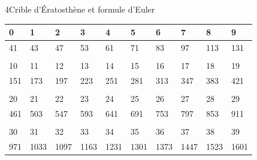 \begin{exercice}{4}{Crible d'Ératosthène et formule d'Euler}
\vspace{20pt}
\def\arraystretch{1.5}
\begin{tabularx}{\linewidth}{|*{10}{>{\centering\arraybackslash}X|}}
\hline
\cellcolor{vlmgray} 0 &\cellcolor{vlmgray} 1 &\cellcolor{vlmgray} 2 &\cellcolor{vlmgray} 3 &\cellcolor{vlmgray} 4 &\cellcolor{vlmgray} 5 &\cellcolor{vlmgray} 6 &\cellcolor{vlmgray} 7 &\cellcolor{vlmgray} 8 &\cellcolor{vlmgray}9 \\
\hline
\textcolor{\colSolution}{41} & \textcolor{\colSolution}{43} & \textcolor{\colSolution}{47} & \textcolor{\colSolution}{53} & \textcolor{\colSolution}{61} & \textcolor{\colSolution}{71} & \textcolor{\colSolution}{83} & \textcolor{\colSolution}{97} & \textcolor{\colSolution}{113} & \textcolor{\colSolution}{131} \\
\hline
\multicolumn{10}{X}{}\\
\hline
\cellcolor{vlmgray} 10 &\cellcolor{vlmgray} 11 &\cellcolor{vlmgray} 12 &\cellcolor{vlmgray} 13 &\cellcolor{vlmgray} 14 &\cellcolor{vlmgray} 15 &\cellcolor{vlmgray} 16 &\cellcolor{vlmgray} 17 &\cellcolor{vlmgray} 18 &\cellcolor{vlmgray}19 \\
\hline
\textcolor{\colSolution}{151} & \textcolor{\colSolution}{173} & \textcolor{\colSolution}{197} & \textcolor{\colSolution}{223} & \textcolor{\colSolution}{251} & \textcolor{\colSolution}{281} & \textcolor{\colSolution}{313} & \textcolor{\colSolution}{347} & \textcolor{\colSolution}{383} & \textcolor{\colSolution}{421} \\
\hline
\multicolumn{10}{X}{}\\
\hline
\cellcolor{vlmgray} 20 &\cellcolor{vlmgray} 21 &\cellcolor{vlmgray} 22 &\cellcolor{vlmgray} 23 &\cellcolor{vlmgray} 24 &\cellcolor{vlmgray} 25 &\cellcolor{vlmgray} 26 &\cellcolor{vlmgray} 27 &\cellcolor{vlmgray} 28 &\cellcolor{vlmgray}29 \\
\hline
\textcolor{\colSolution}{461} & \textcolor{\colSolution}{503} & \textcolor{\colSolution}{547} & \textcolor{\colSolution}{593} & \textcolor{\colSolution}{641} & \textcolor{\colSolution}{691} & \textcolor{\colSolution}{753} & \textcolor{\colSolution}{797} & \textcolor{\colSolution}{853} & \textcolor{\colSolution}{911} \\
\hline
\multicolumn{10}{X}{}\\
\hline
\cellcolor{vlmgray} 30 &\cellcolor{vlmgray} 31 &\cellcolor{vlmgray} 32 &\cellcolor{vlmgray} 33 &\cellcolor{vlmgray} 34 &\cellcolor{vlmgray} 35 &\cellcolor{vlmgray} 36 &\cellcolor{vlmgray} 37 &\cellcolor{vlmgray} 38 &\cellcolor{vlmgray}39 \\
\hline
\textcolor{\colSolution}{971} & \textcolor{\colSolution}{1033} & \textcolor{\colSolution}{1097} & \textcolor{\colSolution}{1163} & \textcolor{\colSolution}{1231} & \textcolor{\colSolution}{1301} & \textcolor{\colSolution}{1373} & \textcolor{\colSolution}{1447} & \textcolor{\colSolution}{1523} & \textcolor{\colSolution}{1601} \\
\hline
\end{tabularx}\def\arraystretch{1}


\end{exercice}
